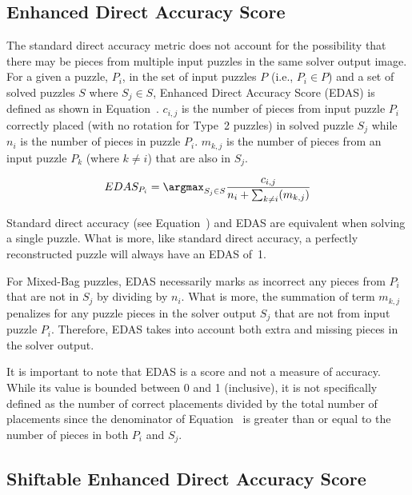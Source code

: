\subsection{Enhanced Direct Accuracy Score}\label{sec:enhancedDirectAccuracyScore}

The standard direct accuracy metric does not account for the possibility that there may be pieces from multiple input puzzles in the same solver output image.  For a given a puzzle, $P_i$, in the set of input puzzles $P$ (i.e., $P_i \in P$) and a set of solved puzzles $S$ where $S_j \in S$, Enhanced Direct Accuracy Score (EDAS) is defined as shown in Equation~.  $c_{i,j}$ is the number of pieces from input puzzle $P_i$ correctly placed (with no rotation for Type~2 puzzles) in solved puzzle $S_j$ while $n_i$ is the number of pieces in puzzle $P_i$. $m_{k,j}$ is the number of pieces from an input puzzle $P_k$ (where $k \ne i$) that are also in $S_j$.

\begin{equation} \label{eq:enhancedDirectAccuracyScore}
EDAS_{P_i} = \argmax_{S_j \in S}\frac{c_{i,j}}{n_i + \sum_{k \ne i}(m_{k,j})}
\end{equation}

Standard direct accuracy (see Equation~) and EDAS are equivalent when solving a single puzzle. What is more, like standard direct accuracy, a perfectly reconstructed puzzle will always have an EDAS of~1. 

For Mixed-Bag puzzles, EDAS necessarily marks as incorrect any pieces from $P_i$ that are not in $S_j$ by dividing by $n_i$.  What is more, the summation of term $m_{k,j}$ penalizes for any puzzle pieces in the solver output $S_j$ that are not from input puzzle $P_i$.  Therefore, EDAS takes into account both extra and missing pieces in the solver output.

It is important to note that EDAS is a score and not a measure of accuracy. While its value is bounded between 0 and 1 (inclusive), it is not specifically defined as the number of correct placements divided by the total number of placements since the denominator of Equation~ is greater than or equal to the number of pieces in both $P_i$ and $S_j$.

\subsection{Shiftable Enhanced Direct Accuracy Score}\label{sec:shiftableEnhancedDirectAccuracy}

